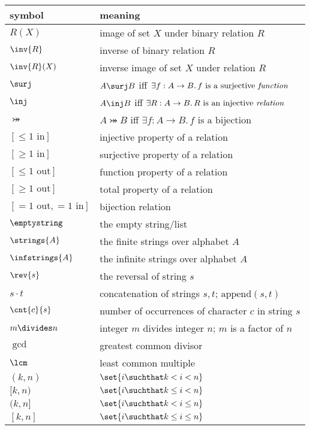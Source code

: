 \begin{center}
\begin{tabular}{ll}
symbol         &  meaning\\
\hline
$R(X)$         & image of set $X$ under binary relation $R$\\
$\inv{R}$      & inverse of binary relation $R$\\
$\inv{R}(X)$   & inverse image of set $X$ under relation $R$\\
$\surj$        & $A \surj B$ iff $\exists f:A \to B.\, f\text{ is a
  surjective \emph{function}}$\\
$\inj$         & $A \inj B$ iff $\exists R:A \to B.\, R\text{ is an
  injective \emph{relation}}$\\
$\bij$         & $A \bij B$ iff $\exists f:A \to B.\, f\text{ is a
  bijection}$\\
$[\leq 1\text{ in}]$  & injective property of a relation\\
$[\geq 1\text{ in}]$  & surjective property of a relation\\
$[\leq 1\text{ out}]$  & function property of a relation\\
$[\geq 1\text{ out}]$  & total property of a relation\\
$[= 1\text{ out}, = 1\text{ in}]$  & bijection relation\\
$\emptystring$ & the empty string/list\\
$\strings{A}$  & the finite strings over alphabet $A$\\
$\infstrings{A}$ & the infinite strings over alphabet $A$\\
$\rev{s}$      & the reversal of string $s$\\
$s \cdot t$    & concatenation of strings $s,t$; $\text{append}(s,t)$\\
$\cnt{c}{s}$   & number of occurrences of character $c$ in string $s$\\
$m \divides n$ & integer $m$ divides integer $n$; $m$ is a factor of $n$\\
$\gcd$         & greatest common divisor\\
$\lcm$         & least common multiple\\
$(k, n)$       & $\set{i \suchthat k < i < n}$\\
$[k, n)$       & $\set{i \suchthat k \le i < n}$\\
$(k, n]$       & $\set{i \suchthat k < i \le n}$\\
$[k,n]$        & $\set{i \suchthat k \le i \le n}$\\

\end{tabular}
\end{center}
